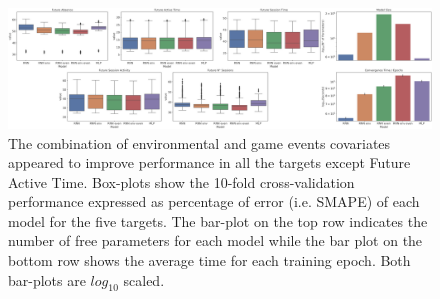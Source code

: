 \begin{figure}[h]
\centering
\includegraphics[width=.8\textwidth]{images/chapter_3/performance_exploded_33.png}
\caption[\textbf{Dis-aggregated comparison of models' performance}]{The combination of environmental and game events covariates appeared to improve performance in all the targets except Future Active Time. Box-plots show the 10-fold cross-validation performance expressed as percentage of error (i.e. SMAPE) of each model for the five targets. The bar-plot on the top row indicates the number of free parameters for each model while the bar plot on the bottom row shows the average time for each training epoch. Both bar-plots are $log_{10}$ scaled.}
\label{model_comp_expl_33} 
\end{figure}

